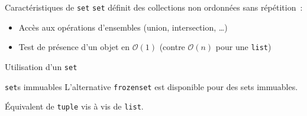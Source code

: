 \begin{frame}{Caractéristiques de \texttt{set}}
  \texttt{set} définit des collections non ordonnées sans répétition~:
  \begin{itemize}
    \item Accès aux opérations d'ensembles (union, intersection, …)
    \item Test de présence d'un objet en $\mathcal{O}(1)$ (contre $\mathcal{O}(n)$ pour une \texttt{list})

  \end{itemize}
\end{frame}

\begin{frame}{Utilisation d'un \texttt{set}}
\end{frame}

\begin{frame}{\texttt{set}s immuables}
  L'alternative \texttt{frozenset} est disponible pour des sets immuables.

  Équivalent de \texttt{tuple} vis à vis de \texttt{list}.
\end{frame}
